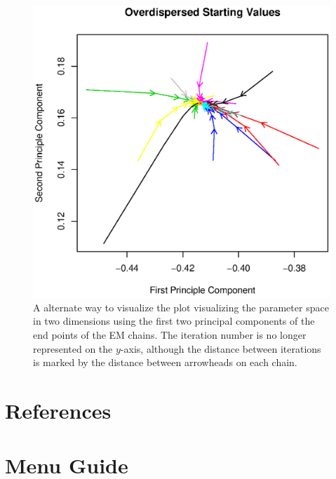 \documentclass[12pt,titlepage]{article}
\begin{document}
\begin{figure}
  \centering
  \includegraphics[scale=.7]{overdis2d.eps}
  \caption{ A alternate way to visualize the plot visualizing the parameter space in two dimensions using the first two principal components of the end points of the EM chains.  The iteration number is no longer represented on the $y$-axis, although the distance between iterations is marked by the distance between arrowheads on each chain.}
\end{figure}



\section{References}
\label{sec:ref}

\section{Menu Guide}
\label{sec:menu}
\end{document}

